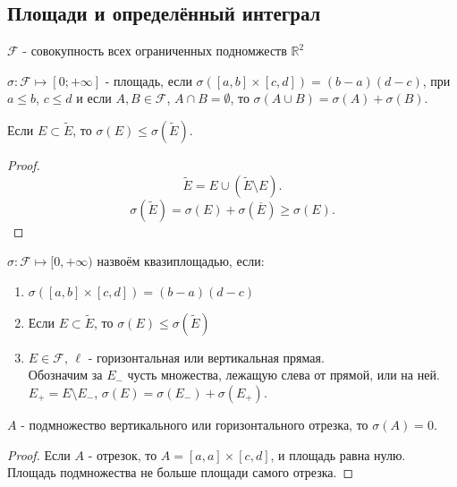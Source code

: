 \documentclass[11pt, oneside]{article}   	%
\begin{document}
    \subsection{Площади и определённый интеграл}
        \begin{definition}
            $\mathcal{F}$ - совокупность всех ограниченных подномжеств $\mathbb{R}^2$
        \end{definition}
        \begin{definition}
            $\sigma : \mathcal{F} \mapsto \left[0; +\infty\right]$ - площадь, если $\sigma\left( \left[a, b\right]\times \left[c, d\right] \right) = (b-a)(d-c)$, при $a\le b$, $c\le d$ и если $A, B\in \mathcal{F}$, $A\cap B = \emptyset$, то $\sigma(A \cup B) = \sigma\left(A\right) + \sigma(B) $.\\

        \end{definition}
        \begin{dlemma}
            Если $E \subset \tilde{E}$, то $\sigma(E) \le \sigma(\tilde{E})$.\\
            \begin{proof}
                \[ \tilde{E} = E \cup (\tilde{E} \setminus E) .\]
                \[ \sigma(\tilde{E}) = \sigma(E) + \sigma(\overline{E}) \ge \sigma(E) .\] 
            \end{proof}
        \end{dlemma}
        \begin{definition}
        $\sigma : \mathcal{F} \mapsto  [0, +\infty)$ назвоём квазиплощадью, если:
            \begin{enumerate}
                \item $\sigma\left( [a, b] \times [c, d] \right) = \left( b-a \right) \left( d-c \right)  $
                \item Если $E \subset  \tilde{E}$, то $\sigma(E) \le \sigma(\tilde{E})$
                \item $E\in \mathcal{F}$, $\ell$ - горизонтальная или вертикальная прямая.\\
                    Обозначим за $E_-$ чусть множества, лежащую слева от прямой, или на ней.\\
                    $E_{+} = E \setminus E_{-}$, $\sigma(E) = \sigma(E_{-}) + \sigma(E_{+})$.
            \end{enumerate}
        \end{definition}
        \begin{dlemma}
            $A$ - подмножество вертикального или горизонтального отрезка, то $\sigma(A) = 0$.\\
            \begin{proof}
                Если $A$ - отрезок, то $A = \left[a, a\right] \times \left[c, d\right]$, и площадь равна нулю.\\
                Площадь подмножества не больше площади самого отрезка.
            \end{proof}
        \end{dlemma}
\end{document}
